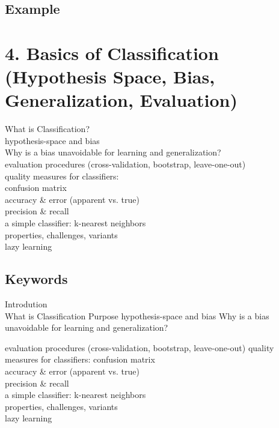 \documentclass[a4paper,10pt,titlepage]{report}
\begin{document}
\subsection{Example}

\newpage
\section{4.	Basics of Classification (Hypothesis Space, Bias, Generalization, Evaluation) }
	What is Classification? \\
	hypothesis-space and bias \\
	Why is a bias unavoidable for learning and generalization? \\
	evaluation procedures (cross-validation, bootstrap, leave-one-out) \\
	quality measures for classifiers: \\
\hspace{10mm}		confusion matrix \\
\hspace{10mm}		accuracy \& error (apparent vs. true) \\
\hspace{10mm}		precision \& recall \\
	a simple classifier: k-nearest neighbors \\
\hspace{10mm}		properties, challenges, variants \\
\hspace{10mm}		lazy learning \\

\subsection{Keywords}

Introdution \\
What is Classification
Purpose
hypothesis-space and bias
Why is a bias unavoidable for learning and generalization?


evaluation procedures (cross-validation, bootstrap, leave-one-out)
quality measures for classifiers:
\hspace{10mm}	confusion matrix \\
\hspace{10mm}	accuracy \& error (apparent vs. true) \\
\hspace{10mm}	precision \& recall \\
a simple classifier: k-nearest neighbors \\
\hspace{10mm}	properties, challenges, variants \\
\hspace{10mm}	lazy learning \\
\end{document}

